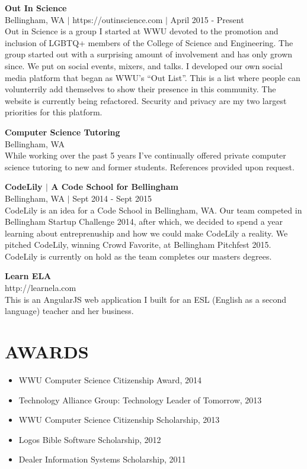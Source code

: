 \documentclass[line,margin]{res}
\begin{document}
\begin{resume}
    {\bf Out In Science} \\
    {\footnotesize Bellingham, WA $|$ https://outinscience.com $|$ April 2015 - Present} \\
    Out in Science is a group I started at WWU devoted to the promotion and inclusion of LGBTQ+ members of the College of Science and Engineering.  The group started out with a surprising amount of involvement and has only grown since.  We put on social events, mixers, and talks.  I developed our own social media platform that began as WWU's ``Out List''.  This is a list where people can volunterrily add themselves to show their presence in this community.  The website is currently being refactored.  Security and privacy are my two largest priorities for this platform.

    {\bf Computer Science Tutoring} \\
    {\footnotesize Bellingham, WA} \\
    While working over the past 5 years I've continually offered private computer science tutoring to new and former students.  References provided upon request.

    {\bf CodeLily $|$ A Code School for Bellingham} \\
    {\footnotesize Bellingham, WA $|$ Sept 2014 - Sept 2015} \\
    CodeLily is an idea for a Code School in Bellingham, WA.  Our team competed in Bellingham Startup Challenge 2014, after which, we decided to spend a year learning about entreprenuship and how we could make CodeLily a reality.  We pitched CodeLily, winning Crowd Favorite, at Bellingham Pitchfest 2015.  CodeLily is currently on hold as the team completes our masters degrees.

    {\bf Learn ELA} \\
    {\footnotesize http://learnela.com} \\
    This is an AngularJS web application I built for an ESL  (English as a second language) teacher and her business.
    
\section{AWARDS}
    \begin{itemize} \itemsep -3pt
        \item WWU Computer Science Citizenship Award, 2014
        \item Technology Alliance Group: Technology Leader of Tomorrow, 2013
        \item WWU Computer Science Citizenship Scholarship, 2013
        \item Logos Bible Software Scholarship, 2012
        \item Dealer Information Systems Scholarship, 2011
    \end{itemize}


\end{resume}
\end{document}
